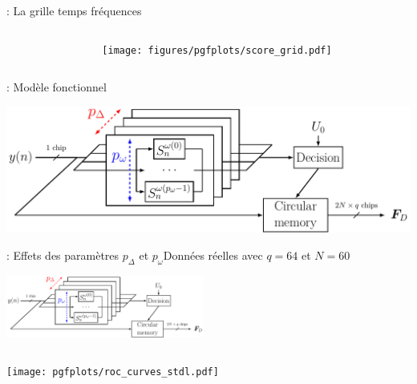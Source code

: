 \documentclass[../main.tex]{subfiles}
\begin{document}
\begin{frame}{\subsecname : {La grille temps fréquences}}
  \begin{columns}
    \begin{column}{.4\linewidth}

    \end{column}
    \begin{column}{.6\linewidth}
      \centering
      \texttt{[image: figures/pgfplots/score\_grid.pdf]}
    \end{column}
  \end{columns}
\end{frame}

\begin{frame}{\subsecname : {Modèle fonctionnel}}
  \begin{center}
    \includegraphics[width=.9\linewidth, height=.75\textheight, keepaspectratio=true]{figures/tikzpicture/funct_view_detection_stdl.pdf}
  \end{center}
\end{frame}

\begin{frame}{\subsecname : {Effets des paramètres $p_\Delta$ et $p_\omega$}}{Données réelles avec $q = 64$ et $N = 60$}
  \begin{overlayarea}{\linewidth}{.15\textheight} \vspace {-1.2cm}
    \hfill \includegraphics[width=6.5cm, height=.75\textheight, keepaspectratio=true]{figures/tikzpicture/funct_view_detection_stdl.pdf}
  \end{overlayarea}
  \begin{columns}
    \begin{column}{.65\linewidth}
      \begin{overlayarea}{\linewidth}{.75\textheight} \vspace {-.5cm}
        \texttt{[image: pgfplots/roc\_curves\_stdl.pdf]}
      \end{overlayarea}
    \end{column}
    \begin{column}{.35\linewidth}
    \end{column}
  \end{columns}
\end{frame}
\end{document}

